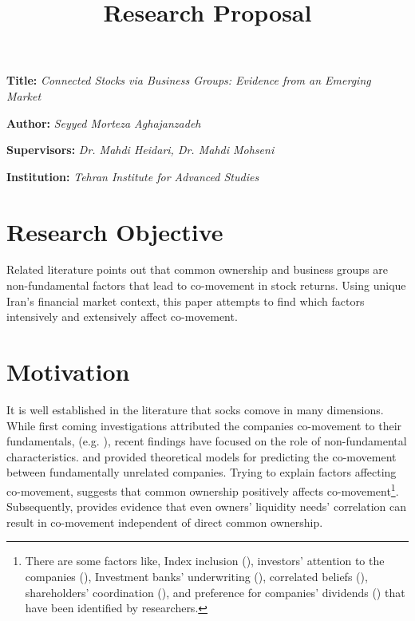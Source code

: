 \documentclass[12pt, a4paper]{article}
\title{\textbf{Research Proposal}}
\author{}
\date{}
\newcommand{\namelistlabel}[1]{\mbox{#1}\hfil}
\newenvironment{namelist}[1]{%
	\begin{list}{}
		{
			\let\makelabel\namelistlabel
			\settowidth{\labelwidth}{#1}
			\setlength{\leftmargin}{1.1\labelwidth}
		}
	}{%
\end{list}}
\begin{document}
\maketitle
\begin{namelist}{xxxxxxxxxxxx}
	\item[{\bf Title:}]
	\textit{Connected Stocks via Business Groups: Evidence from an Emerging Market }
	\item[{\bf Author:}]
	\textit{ Seyyed Morteza Aghajanzadeh}
	\item[{\bf Supervisors:}]
	\textit{	Dr. Mahdi Heidari, Dr. Mahdi Mohseni}
	\item[{\bf Institution:}]
	\textit{	Tehran Institute for Advanced Studies}
\end{namelist}


\section*{Research Objective}
Related literature points out that common ownership and business groups are non-fundamental factors that lead to co-movement in stock returns. Using unique Iran's financial market context, this paper attempts to find which factors intensively and extensively affect co-movement. 
\section*{Motivation}
	{
	It is well established in the literature that socks comove in many dimensions. While first coming  investigations   attributed the companies co-movement to their fundamentals, (e.g. {\cite{shiller1989comovements}})}, recent findings have focused on the role of non-fundamental characteristics. {\cite{barberis2003style} and \cite{barberis2005comovement}} provided theoretical models for predicting the co-movement between fundamentally unrelated companies.	Trying to explain factors affecting co-movement, \cite{AntonPolk} suggests that common ownership positively affects co-movement\footnote{There are some factors like, Index inclusion ({\cite{barberis2005comovement}}), investors' attention to the companies ({\cite{wu2014investor}}), Investment banks' underwriting ({\cite{grullon2014comovement}}), correlated beliefs ({\cite{david2016correlated}}), shareholders' coordination ({\cite{pantzalis2017shareholder}}), and preference for companies' dividends ({\cite{HAMEED2019103}}) that have been identified by researchers.}.	Subsequently, {\cite{Liquidity2016}} provides evidence that even owners' liquidity needs' correlation can result in co-movement independent of direct common ownership.	
	
\end{document}
